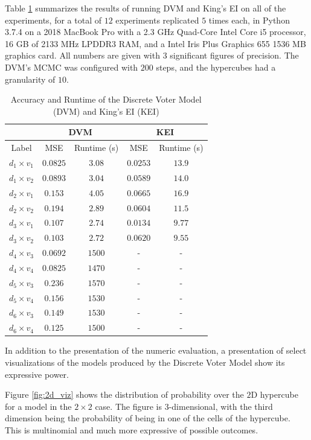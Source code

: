 Table \ref{table:results} summarizes the results of running DVM and King's EI on all of the experiments, for a total of $12$ experiments replicated $5$ times each, in Python 3.7.4 on a 2018 MacBook Pro with a 2.3 GHz Quad-Core Intel Core i5 processor, 16 GB of 2133 MHz LPDDR3 RAM, and a Intel Iris Plus Graphics 655 1536 MB graphics card. All numbers are given with $3$ significant figures of precision. The DVM's MCMC was configured with $200$ steps, and the hypercubes had a granularity of $10$.

\begin{table}[ht]
 \centering
 \caption{Accuracy and Runtime of the Discrete Voter Model (DVM) and King's EI (KEI)}
 \label{table:results}
 \begin{tabular}{|c|c|c|c|c|}
   \hline
   & \multicolumn{2}{|c|}{DVM} & \multicolumn{2}{|c|}{KEI} \\
   \hline
   Label & MSE & Runtime (s) & MSE & Runtime (s) \\
   \hline
   $d_1 \times v_1$ & $0.0825$ & $3.08$ & $0.0253$ & $13.9$ \\
   $d_1 \times v_2$ & $0.0893$ & $3.04$ & $0.0589$ & $14.0$ \\
   \hline
   $d_2 \times v_1$ & $0.153$ & $4.05$ & $0.0665$ & $16.9$ \\
   $d_2 \times v_2$ & $0.194$ & $2.89$ & $0.0604$ & $11.5$ \\
   \hline
   $d_3 \times v_1$ & $0.107$ & $2.74$ & $0.0134$ & $9.77$ \\
   $d_3 \times v_2$ & $0.103$ & $2.72$ & $0.0620$ & $9.55$ \\
   \hline
   $d_4 \times v_3$ & $0.0692$ & $1500$ & - & - \\
   $d_4 \times v_4$ & $0.0825$ & $1470$ & - & - \\
   \hline
   $d_5 \times v_3$ & $0.236$ & $1570$ & - & - \\
   $d_5 \times v_4$ & $0.156$ & $1530$ & - & - \\
   \hline
   $d_6 \times v_3$ & $0.149$ & $1530$ & - & - \\
   $d_6 \times v_4$ & $0.125$ & $1500$ & - & - \\
  \hline
 \end{tabular}
\end{table}

In addition to the presentation of the numeric evaluation, a presentation of select visualizations of the models produced by the Discrete Voter Model show its expressive power.

Figure \ref{fig:2d_viz} shows the distribution of probability over the $2$D hypercube for a model in the $2 \times 2$ case. The figure is $3$-dimensional, with the third dimension being the probability of being in one of the cells of the hypercube. This is multinomial and much more expressive of possible outcomes.

